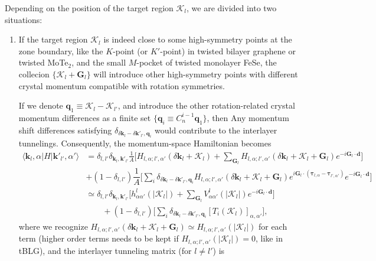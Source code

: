 Depending on the position of the target region $\bm{\mathcal K}_l$, we are divided into two situations:
\begin{enumerate}
    \item If the target region $\bm{\mathcal K}_l$ is indeed close to some high-symmetry points at the zone boundary, like the $K$-point (or $K'$-point) in twisted bilayer graphene or twisted MoTe$_2$, and the small $M$-pocket of twisted monolayer FeSe, the collecion $\{\bm{\mathcal K}_l+\bm G_l\}$ will introduce other high-symmetry points with different crystal momentum compatible with rotation symmetries.

          If we denote $\bm q_1\equiv\bm{\mathcal K}_l-\bm{\mathcal K}_{l'}$, and introduce the other rotation-related crystal momentum differences as a finite set $\{\bm q_i\equiv C_n^{i-1}\bm q_1\}$, then Any momentum shift differences satisfying $\delta_{\delta\bm k_l-\delta\bm k'_{l'},\bm q_i}$ would contribute to the interlayer tunnelings. Consequently, the momentum-space Hamiltonian becomes
          \begin{align}
              \langle \bm k_l,\alpha|H|\bm k'_{l'},\alpha'\rangle & = \delta_{l,l'}\delta_{\bm k_l,\bm k'_{l'}}\frac{1}{A}\bigg[H_{l,\alpha;l',\alpha'}(\delta\bm k_l+\bm{\mathcal K}_l)+\sum_{\bm G_l}H_{l,\alpha;l',\alpha'}(\delta\bm k_l+\bm{\mathcal K}_l+\bm G_l)e^{-i\bm G_l\cdot\bm d}\bigg]                   \nonumber \\
                                                                  & +(1-\delta_{l,l'})\dfrac{1}{A}\bigg[\sum_i \delta_{\delta\bm k_l-\delta\bm k'_{l'},\bm q_i}H_{l,\alpha;l',\alpha'}(\delta\bm k_l+\bm{\mathcal K}_l+\bm G_l)e^{i\bm G_l\cdot(\bm\tau_{l,\alpha}-\bm\tau_{l',\alpha'})}e^{-i\bm G_l\cdot\bm d}\bigg] \nonumber \\
                                                                  & \simeq \delta_{l,l'}\delta_{\bm k_l,\bm k'_{l'}}\bigg[h^l_{\alpha\alpha'}(|\bm{\mathcal K}_l|)+\sum_{\bm G_l}V^l_{\alpha\alpha'}(|\bm{\mathcal K}_l|)e^{-i\bm G_l\cdot\bm d}\bigg]                                                                 \nonumber \\
                                                                  & \qquad+(1-\delta_{l,l'})\bigg[\sum_i \delta_{\delta\bm k_l-\delta\bm k'_{l'},\bm q_i}[T_i(\bm{\mathcal K}_l)]_{\alpha,\alpha'}\bigg],\label{eq:moire_Hamiltonian_at_high_symmetry_point}
          \end{align}
          where we recognize $H_{l,\alpha;l',\alpha'}(\delta\bm k_l+\bm{\mathcal K}_l+\bm G_l)\simeq H_{l,\alpha;l',\alpha'}(|\bm{\mathcal K}_l|)$ for each term (higher order terms needs to be kept if $H_{l,\alpha;l',\alpha'}(|\bm{\mathcal K}_l|)=0$, like in tBLG), and the interlayer tunneling matrix (for $l\neq l'$) is

\end{enumerate}
